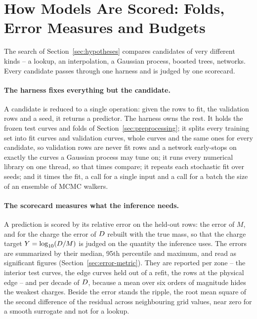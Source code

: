 \section{How Models Are Scored: Folds, Error Measures and Budgets}
\label{sec:optimization}
\ifdefined\zoneNsMassInterior\else{}\fi

The search of Section~\ref{sec:hypotheses} compares candidates of very different kinds -- a lookup, an interpolation, a Gaussian process, boosted trees, networks. Every candidate passes through one harness and is judged by one scorecard.

\paragraph{The harness fixes everything but the candidate.}
A candidate is reduced to a single operation: given the rows to fit, the validation rows and a seed, it returns a predictor. The harness owns the rest. It holds the frozen test curves and folds of Section~\ref{sec:preprocessing}; it splits every training set into fit curves and validation curves, whole curves and the same ones for every candidate, so validation rows are never fit rows and a network early-stops on exactly the curves a Gaussian process may tune on; it runs every numerical library on one thread, so that times compare; it repeats each stochastic fit over seeds; and it times the fit, a call for a single input and a call for a batch the size of an ensemble of MCMC walkers.

\paragraph{The scorecard measures what the inference needs.}
A prediction is scored by its relative error on the held-out rows: the error of $M$, and for the charge the error of $D$ rebuilt with the true mass, so that the charge target $Y = \log_{10}(D/M)$ is judged on the quantity the inference uses. The errors are summarized by their median, 95th percentile and maximum, and read as significant figures (Section~\ref{sec:error-metric}). They are reported per zone -- the interior test curves, the edge curves held out of a refit, the rows at the physical edge -- and per decade of $D$, because a mean over six orders of magnitude hides the weakest charges. Beside the error stands the ripple, the root mean square of the second difference of the residual across neighbouring grid values, near zero for a smooth surrogate and not for a lookup.

